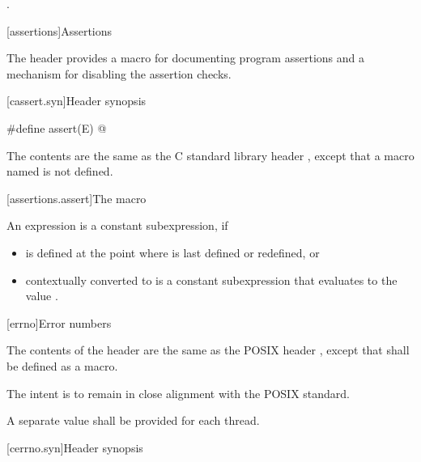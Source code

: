 \begin{itemdescr}
\pnum
{}

\pnum
\ensures
{}.
\end{itemdescr}

[assertions]{Assertions}

\pnum
The header
provides a macro for documenting \Cpp{} program assertions and a mechanism
for disabling the assertion checks.

[cassert.syn]{Header  synopsis}

%
%
\begin{codeblock}
#define assert(E) @\seebelow@
\end{codeblock}

\pnum
{}%
%
The contents are the same as the C standard library header
,
except that a macro named 
is not defined.


[assertions.assert]{The  macro}

\pnum
An expression 
is a constant subexpression, if
\begin{itemize}
\item
{} is defined at the point where 
is last defined or redefined, or
\item
{} contextually converted to 
is a constant subexpression that evaluates to the value .
\end{itemize}

[errno]{Error numbers}

\pnum
{}%
The contents of the header  are the same as the POSIX header
, except that  shall be defined as a macro.
\begin{note}
The intent is to remain in close alignment with the POSIX standard.
\end{note}
A separate  value shall be provided for each thread.

[cerrno.syn]{Header  synopsis}

